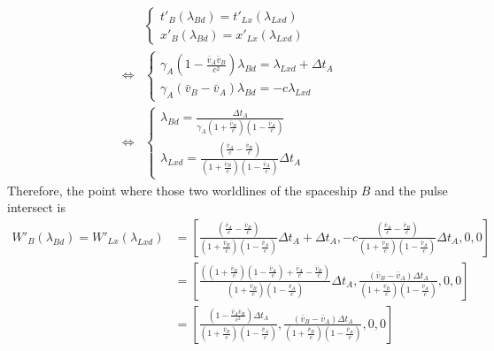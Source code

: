 \documentclass[12pt]{article}
\begin{document}
\begin{align*}
&\left\{
\begin{array}{l}
t'_{B}(\lambda_{Bd}) = t'_{Lx}(\lambda_{Lxd})\\[1em]
x'_{B}(\lambda_{Bd}) = x'_{Lx}(\lambda_{Lxd}) 
\end{array}
\right.\\[1em]
\Leftrightarrow 
&\left\{
\begin{array}{l}
\gamma_A \left(1 - \frac{\bar{v}_A \bar{v}_B}{c^2}\right) \lambda_{Bd} = \lambda_{Lxd} + \Delta t_A\\[1em]
\gamma_A \left( \bar{v}_B - \bar{v}_A\right) \lambda_{Bd} = -c \lambda_{Lxd}
\end{array}
\right.\\[1em]
\Leftrightarrow
&\left\{
\begin{array}{l}
\lambda_{Bd} = \frac{\Delta t_A}{\gamma_A \left( 1 + \frac{\bar{v}_B}{c}\right) \left( 1 - \frac{\bar{v}_A}{c}\right)}\\[1em]
\lambda_{Lxd} = \frac{\left( \frac{\bar{v}_A}{c} - \frac{\bar{v}_B}{c}\right)}{\left( 1 + \frac{\bar{v}_B}{c}\right) \left( 1 - \frac{\bar{v}_A}{c}\right)} \Delta t_A
\end{array}
\right.
\end{align*}
Therefore, the point where those two worldlines of the spaceship $B$ and the pulse intersect is
\begin{align*}
W'_B(\lambda_{Bd}) = W'_{Lx}(\lambda_{Lxd}) &= \left[\frac{\left( \frac{\bar{v}_A}{c} - \frac{\bar{v}_B}{c}\right)}{\left( 1 + \frac{\bar{v}_B}{c}\right) \left( 1 - \frac{\bar{v}_A}{c}\right)} \Delta t_A + \Delta t_A, -c \frac{\left( \frac{\bar{v}_A}{c} - \frac{\bar{v}_B}{c}\right)}{\left( 1 + \frac{\bar{v}_B}{c}\right) \left( 1 - \frac{\bar{v}_A}{c}\right)} \Delta t_A, 0, 0 \right]\\[1em]
&= \left[\frac{\left( \left( 1 + \frac{\bar{v}_B}{c}\right) \left( 1 - \frac{\bar{v}_A}{c}\right) + \frac{\bar{v}_A}{c} - \frac{\bar{v}_B}{c}\right)}{\left( 1 + \frac{\bar{v}_B}{c}\right) \left( 1 - \frac{\bar{v}_A}{c}\right)} \Delta t_A, \frac{\left( \bar{v}_B - \bar{v}_A\right) \Delta t_A}{\left( 1 + \frac{\bar{v}_B}{c}\right) \left( 1 - \frac{\bar{v}_A}{c}\right)}, 0, 0 \right]\\[1em]
&= \left[\frac{\left(1 - \frac{\bar{v}_A \bar{v}_B}{c^2}\right) \Delta t_A}{\left( 1 + \frac{\bar{v}_B}{c}\right) \left( 1 - \frac{\bar{v}_A}{c}\right)}, \frac{\left( \bar{v}_B - \bar{v}_A\right) \Delta t_A}{\left( 1 + \frac{\bar{v}_B}{c}\right) \left( 1 - \frac{\bar{v}_A}{c}\right)}, 0, 0 \right]
\end{align*}
\end{document}
